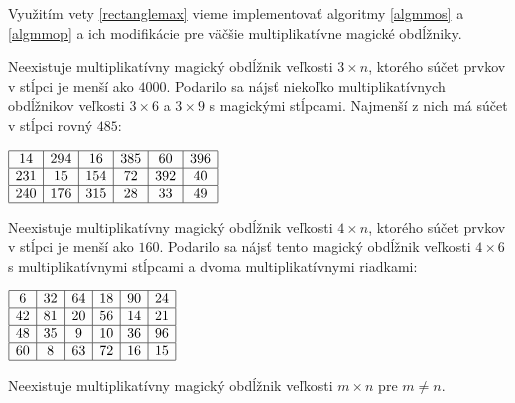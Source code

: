 Využitím vety \ref{rectanglemax} vieme implementovať algoritmy \ref{algmmos} a \ref{algmmop} a ich modifikácie pre väčšie multiplikatívne magické obdĺžniky. 

\begin{result} Neexistuje multiplikatívny magický obdĺžnik veľkosti $3 \times n$, ktorého súčet prvkov v stĺpci je menší ako $4000$. Podarilo sa nájsť niekoľko multiplikatívnych obdĺžnikov veľkosti $3 \times 6$ a $3 \times 9$ s magickými stĺpcami. Najmenší z nich má súčet v stĺpci rovný $485$:
\end{result}

\begin{center}
$\begin{array}{ |c|c|c|c|c|c| } 
\hline
14 & 294 & 16 & 385 & 60 & 396 \\ 
\hline
231 & 15 & 154 & 72 & 392 & 40 \\ 
\hline
240 & 176 & 315 & 28 & 33 & 49 \\ 
\hline
\end{array}$
\end{center}

\begin{result} Neexistuje multiplikatívny magický obdĺžnik veľkosti $4 \times n$, ktorého súčet prvkov v stĺpci je menší ako $160$. Podarilo sa nájsť tento magický obdĺžnik veľkosti $4 \times 6$ s multiplikatívnymi stĺpcami a dvoma multiplikatívnymi riadkami:
\end{result}

\begin{center}
$\begin{array}{ |c|c|c|c|c|c| } 
\hline
6 & 32 & 64 & 18 & 90 & 24 \\ 
\hline
42 & 81 & 20 & 56 & 14 & 21 \\ 
\hline
48 & 35 & 9 & 10 & 36 & 96 \\ 
\hline
60 & 8 & 63 & 72 & 16 & 15 \\ 
\hline
\end{array}$
\end{center}

\begin{hypothesis} Neexistuje multiplikatívny magický obdĺžnik veľkosti $m \times n$ pre $m \neq n$.
\end{hypothesis}

